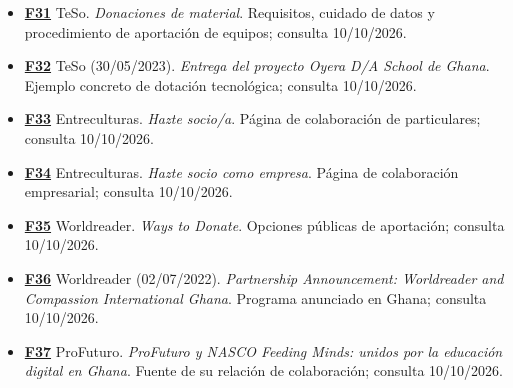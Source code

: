\documentclass[
]{article}
\providecommand{\tightlist}{%
  \setlength{\itemsep}{0pt}\setlength{\parskip}{0pt}}
\begin{document}
\begin{itemize}
\tightlist
\item
  \textbf{\href{https://teso.org.es/informacion/donar-material/}{F31}}
  TeSo. \emph{Donaciones de material}. Requisitos, cuidado de datos y
  procedimiento de aportación de equipos; consulta 10/10/2026.
\item
  \textbf{\href{https://teso.org.es/entrega-del-proyecto-oyera-d-a-school-de-ghana/}{F32}}
  TeSo (30/05/2023). \emph{Entrega del proyecto Oyera D/A School de
  Ghana}. Ejemplo concreto de dotación tecnológica; consulta 10/10/2026.
\item
  \textbf{\href{https://www.entreculturas.org/hazte-socio/}{F33}}
  Entreculturas. \emph{Hazte socio/a}. Página de colaboración de
  particulares; consulta 10/10/2026.
\item
  \textbf{\href{https://www.entreculturas.org/hazte-socio-empresas/}{F34}}
  Entreculturas. \emph{Hazte socio como empresa}. Página de colaboración
  empresarial; consulta 10/10/2026.
\item
  \textbf{\href{https://www.worldreader.org/ways-to-donate/}{F35}}
  Worldreader. \emph{Ways to Donate}. Opciones públicas de aportación;
  consulta 10/10/2026.
\item
  \textbf{\href{https://www.worldreader.org/now/worldreader-and-compassion-international-join-forces/}{F36}}
  Worldreader (02/07/2022). \emph{Partnership Announcement: Worldreader
  and Compassion International Ghana}. Programa anunciado en Ghana;
  consulta 10/10/2026.
\item
  \textbf{\href{https://profuturo.education/noticias/profuturo-nasco-feeding-minds-educacion-digital-ghana/}{F37}}
  ProFuturo. \emph{ProFuturo y NASCO Feeding Minds: unidos por la
  educación digital en Ghana}. Fuente de su relación de colaboración;
  consulta 10/10/2026.
\end{itemize}
\end{document}
